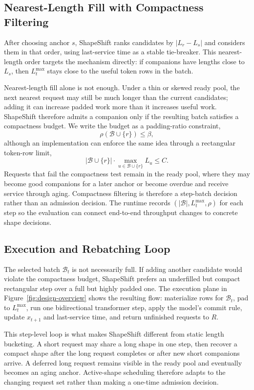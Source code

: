 \documentclass[a4paper]{llncs}
\begin{document}
\subsection{Nearest-Length Fill with Compactness Filtering}

After choosing anchor $s$, ShapeShift ranks candidates by $|L_r-L_s|$ and considers them in that order, using last-service time as a stable tie-breaker. This nearest-length order targets the mechanism directly: if companions have lengths close to $L_s$, then $L_t^{\max}$ stays close to the useful token rows in the batch.

Nearest-length fill alone is not enough. Under a thin or skewed ready pool, the next nearest request may still be much longer than the current candidates; adding it can increase padded work more than it increases useful work. ShapeShift therefore admits a companion only if the resulting batch satisfies a compactness budget. We write the budget as a padding-ratio constraint,
\[
  \rho(\mathcal{B}\cup\{r\}) \le \beta,
\]
although an implementation can enforce the same idea through a rectangular token-row limit,
\[
  |\mathcal{B}\cup\{r\}|\cdot \max_{u\in\mathcal{B}\cup\{r\}} L_u \le C.
\]
Requests that fail the compactness test remain in the ready pool, where they may become good companions for a later anchor or become overdue and receive service through aging. Compactness filtering is therefore a step-batch decision rather than an admission decision. The runtime records $(|\mathcal{B}|,L_t^{\max},\rho)$ for each step so the evaluation can connect end-to-end throughput changes to concrete shape decisions.

\subsection{Execution and Rebatching Loop}

The selected batch $\mathcal{B}_t$ is not necessarily full. If adding another candidate would violate the compactness budget, ShapeShift prefers an underfilled but compact rectangular step over a full but highly padded one. The execution plane in Figure~\ref{fig:design-overview} shows the resulting flow: materialize rows for $\mathcal{B}_t$, pad to $L_t^{\max}$, run one bidirectional transformer step, apply the model's commit rule, update $x_{t+1}$ and last-service time, and return unfinished requests to $R$.

This step-level loop is what makes ShapeShift different from static length bucketing. A short request may share a long shape in one step, then recover a compact shape after the long request completes or after new short companions arrive. A deferred long request remains visible in the ready pool and eventually becomes an aging anchor. Active-shape scheduling therefore adapts to the changing request set rather than making a one-time admission decision.
\end{document}
